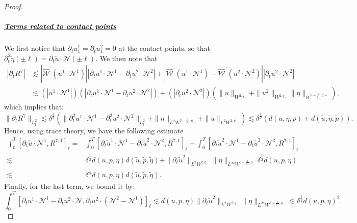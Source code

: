 \documentclass[letterpaper,reqno,10pt,twoside]{amsart}
\theoremstyle{definition}
\theoremstyle{remark}
\def\p{\partial}
\begin{document}
\begin{proof}
			\subparagraph{\underline{Terms related to contact points}}
			We first notice that $\p_tu^1_1=\p_tu^2_1=0$ at the contact points, so that $
			\p_t^2\tilde{\eta}(\pm\ell)=\p_t\tilde{u}\cdot\mathcal{N}(\pm\ell)$.
			We then note that
			\[
			\begin{aligned}
				|\p_{t}R^{7}|&
				\lesssim |\hat{\mathscr{W}}^\prime(u^{1}\cdot \mathcal{N}^{1})||\p_tu^{1}\cdot \mathcal{N}^{1}-\p_{t}u^{2}\cdot \mathcal{N}^{2}|+|\hat{\mathscr{W}}^\prime(u^{1}\cdot \mathcal{N}^{1})-\hat{\mathscr{W}}^{\prime}(u^{2}\cdot \mathcal{N}^{2})||\p_tu^{2}\cdot \mathcal{N}^{2}|\\
				&\lesssim (|u^{1}\cdot \mathcal{N}^{1}|)(|\p_{t}u^{1}\cdot \mathcal{N}^{1}-\p_{t}u^{2}\cdot \mathcal{N}^{2}|)+(|\p_{t}u^{2}\cdot \mathcal{N}^{2}|)(\|u\|_{W^{2,q_{-}}}+\|u^{2}\|_{W^{2,q_{-}}}\|\eta\|_{W^{3-\frac{1}{q_{-}},q_{}-}}),
			\end{aligned}
			\]
			\noindent which implies that:
			\[
			\|\p_{t}R^{7}\|_{L_{t}^{2}} \lesssim \delta^{\frac{1}{2}}(\|\p_t^2u^{1}\cdot \mathcal{N}^{1}-\p_{t}^{2}u^{2}\cdot \mathcal{N}^{2}\|_{L_{t}^{2}}+\|\eta\|_{L^{2}W^{3-\frac{1}{q_{-}},q_{-}}}+\|u\|_{L^{2}W^{2,q_{-}}})\lesssim \delta^{\frac{1}{2}}(d(u,\eta,p)+d(\tilde{u},\tilde{\eta},\tilde{p})).
			\]
			Hence, using trace theory, we have the following estimate
			\begin{equation}\label{est:remain_points}
				\begin{aligned}
					\int_0^T[\p_{t}\tilde{u}\cdot\mathcal{N}^1,  R^{7,1}]_\ell=& \int_{0}^{T}[\p_{t}\tilde{u}^{1}\cdot\mathcal{N}^1-\p_{t}\tilde{u}^{2}\cdot \mathcal{N}^{2},  R^{7,1}]_\ell+\int_{0}^{T}[\p_{t}\tilde{u}^{2}\cdot\mathcal{N}^1-\p_{t}\tilde{u}^{2}\cdot \mathcal{N}^{2},  R^{7,1}]_\ell\\
					\lesssim& \delta^{\frac{1}{2}}d(u,p,\eta)d(\tilde{u},\tilde{p},\tilde{\eta})+\|\p_{t}\tilde{u}^{2}\|_{L^{2}W^{2,q_{-}}}\|\eta\|_{L^{\infty}W^{3-\frac{1}{q_{-}},q_{-}}}\delta^{\frac{1}{2}}d(u,p,\eta)\\
					\lesssim&\delta^{\frac{1}{2}}d(u,p,\eta)d(\tilde{u},\tilde{p},\tilde{\eta}).
				\end{aligned}
			\end{equation}
			Finally, for the last term, we bound it by:
			\[
			\int_{0}^{T}[\p_{t}u^{1}\cdot \mathcal{N}^{1}-\p_{t}u^{2}\cdot \mathcal{N},\p_{t}u^{2}\cdot (\mathcal{N}^{2}-\mathcal{N}^{1})]_{\ell}\lesssim d(u,p,\eta)\|\p_{t}\tilde{u}^{2}\|_{L^{2}W^{2,q_{-}}}\|\eta\|_{L^{\infty}W^{3-\frac{1}{q_{-}},q_{-}}}\lesssim \delta^{\frac{1}{2}}d(u,p,\eta)^{2}.
			\]

\end{proof}
\end{document}
